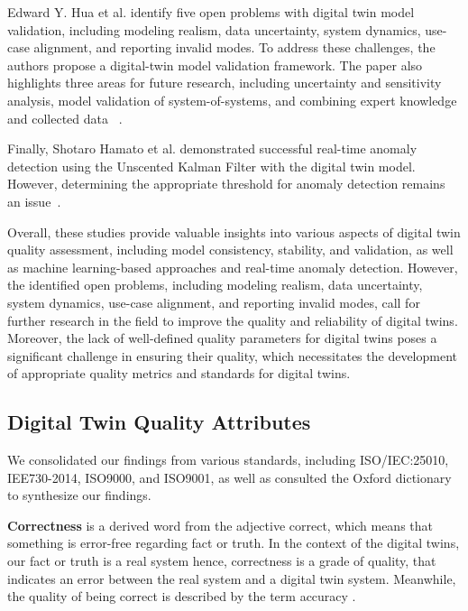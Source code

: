 \documentclass{llncs}
\begin{document}
    Edward Y. Hua et al. identify five open problems with digital twin model validation, including modeling realism, data uncertainty, system dynamics, use-case alignment, and reporting invalid modes. To address these challenges, the authors propose a digital-twin model validation framework. The paper also highlights three areas for future research, 
    including uncertainty and sensitivity analysis, model validation of system-of-systems, and combining expert knowledge and collected data ~\cite{ValidationofDigitalTwins}. 

    Finally, Shotaro Hamato et al. demonstrated successful real-time anomaly detection using the Unscented Kalman Filter with the digital twin model. 
    However, determining the appropriate threshold for anomaly detection remains an issue~\cite{JapeneseKalmanFilterCorrectness}.

    Overall, these studies provide valuable insights into various aspects of digital twin quality assessment, 
    including model consistency, stability, and validation, as well as machine learning-based approaches and real-time anomaly detection. 
    However, the identified open problems, including modeling realism, data uncertainty, system dynamics, use-case alignment, and reporting invalid modes, 
    call for further research in the field to improve the quality and reliability of digital twins. Moreover, 
    the lack of well-defined quality parameters for digital twins poses a significant challenge in ensuring their quality,
    which necessitates the development of appropriate quality metrics and standards for digital twins.
    \subsection{Digital Twin Quality Attributes}\label{section:Digital Twin Quality Attributes}
    We consolidated our findings from various standards, including ISO/IEC:25010, IEE730-2014, ISO9000, and ISO9001, as well as consulted the  Oxford dictionary to 
    synthesize our findings\cite{ISO9000,ISO90012015,ISO/IEC:25010,IEE730-2014, OxfordDictionary}.
    
    \textbf{Correctness} is a  derived word from the adjective correct, which means that something is error-free regarding fact or truth. In the context of the digital twins, our fact or truth is a real system hence, correctness is a grade of quality, that indicates an error between the real system and a digital twin system.
    Meanwhile, the quality of being correct is described by the term accuracy \cite{OxfordDictionary}. 
    
\end{document}
